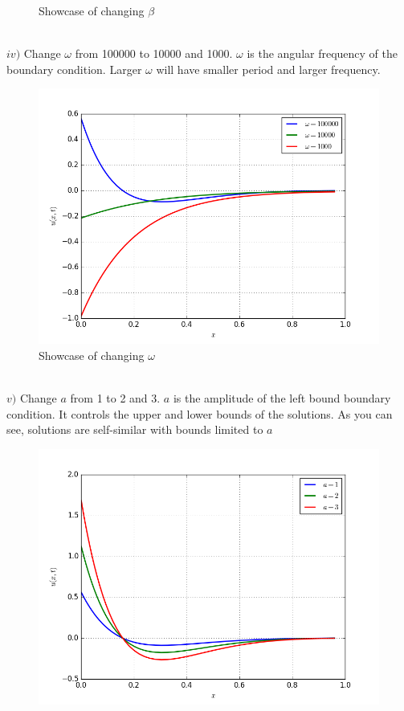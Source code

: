 \documentclass[12pt]{article}
\newenvironment{problem}[2][Problem]{\begin{trivlist}
\item[\hskip \labelsep {\bfseries #1}\hskip \labelsep {\bfseries #2.}]}{\end{trivlist}}
\begin{document}
\begin{problem}{3}
\begin{figure}[H]
 \caption{Showcase of changing $\beta$}
\label{label}
\end{figure}
\text{}\\
$iv)$ Change $\omega$ from 100000 to 10000 and 1000. $\omega$ is the angular frequency of the boundary condition. Larger  $\omega$ will have smaller period and larger frequency.\\
\begin{figure}[H]
\centering
  \includegraphics[scale=0.5]{p3a_change_w.png}
 \caption{Showcase of changing $\omega$}
\label{label}
\end{figure}
\text{}\\
$v)$ Change $a$ from 1 to 2 and 3. $a$ is the amplitude of the left bound boundary condition. It controls the upper and lower bounds of the solutions. As you can see, solutions are self-similar with bounds limited to $a$\\
\begin{figure}[H]
\centering
  \includegraphics[scale=0.5]{p3a_change_a.png}

\end{figure}
\end{problem}
\end{document}
